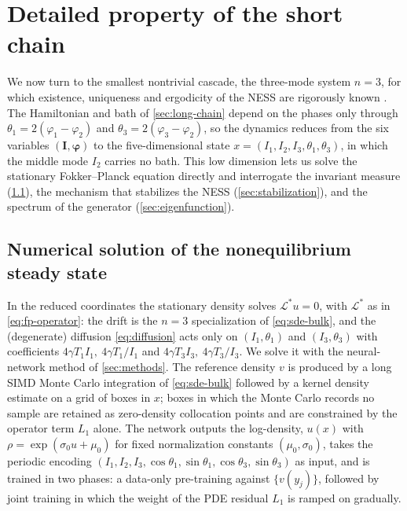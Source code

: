 \documentclass[11pt,a4paper]{article}
\theoremstyle{definition}
\numberwithin{equation}{section}   %
\newcommand{\bI}{\mathbf{I}}
\newcommand{\bphi}{\boldsymbol{\varphi}}
\newcommand{\Ladj}{\mathcal{L}^{*}}
\begin{document}
\section{Detailed property of the short chain}\label{sec:short-chain}

We now turn to the smallest nontrivial cascade, the three-mode system $n=3$,
for which existence, uniqueness and ergodicity of the NESS are rigorously known
\cite{HLNS}. The Hamiltonian and bath of \cref{sec:long-chain} depend on the
phases only through $\theta_1=2(\varphi_1-\varphi_2)$ and
$\theta_3=2(\varphi_3-\varphi_2)$, so the dynamics reduces from the six
variables $(\bI,\bphi)$ to the five-dimensional state
$x=(I_1,I_2,I_3,\theta_1,\theta_3)$, in which the middle mode $I_2$ carries no
bath. This low dimension lets us solve the stationary Fokker--Planck equation
directly and interrogate the invariant measure (\cref{sec:fp-numerics}), the
mechanism that stabilizes the NESS (\cref{sec:stabilization}), and the spectrum
of the generator (\cref{sec:eigenfunction}).

\subsection{Numerical solution of the nonequilibrium steady state}\label{sec:fp-numerics}

In the reduced coordinates the stationary density solves $\Ladj u=0$, with
$\Ladj$ as in \eqref{eq:fp-operator}: the drift is the $n=3$ specialization of
\eqref{eq:sde-bulk}, and the (degenerate) diffusion \eqref{eq:diffusion} acts
only on $(I_1,\theta_1)$ and $(I_3,\theta_3)$ with coefficients
$4\gamma T_1 I_1,\ 4\gamma T_1/I_1$ and $4\gamma T_3 I_3,\ 4\gamma T_3/I_3$. We
solve it with the neural-network method of \cref{sec:methods}. The reference
density $v$ is produced by a long SIMD Monte Carlo integration of
\eqref{eq:sde-bulk} followed by a kernel density estimate on a grid of boxes in
$x$; boxes in which the Monte Carlo records no sample are retained as
zero-density collocation points and are constrained by the operator term $L_1$
alone. The network outputs the log-density, $u(x)$ with $\rho=\exp(\sigma_0
u+\mu_0)$ for fixed normalization constants $(\mu_0,\sigma_0)$, takes the
periodic encoding $(I_1,I_2,I_3,\cos\theta_1,\sin\theta_1,\cos\theta_3,
\sin\theta_3)$ as input, and is trained in two phases: a data-only pre-training
against $\{v(y_j)\}$, followed by joint training in which the weight of the PDE
residual $L_1$ is ramped on gradually.
\end{document}
